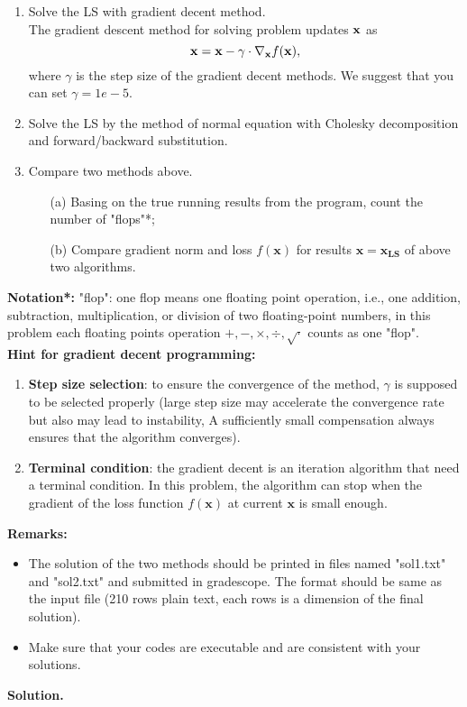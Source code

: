 \documentclass[english,onecolumn]{IEEEtran}
\begin{document}
\begin{enumerate}
    \item Solve the LS with gradient decent method.\\
    The gradient descent method for solving problem updates $ {\bf x}$ as
    $$
        {\bf x} = {\bf x} - \gamma \cdot \nabla_{{\bf x}} f(\mathbf{x}),
    $$
    where $\gamma$ is the step size of the gradient decent methods. We suggest that you can set $\gamma=1e-5$.
    \item Solve the LS by the method of normal equation with Cholesky decomposition and forward/backward substitution.
    \item Compare two methods above. 
    \begin{enumerate}
        \item[(a)] Basing on the true running results from the program, count the number of "flops"*;
        \item[(b)] Compare gradient norm and loss $f(\mathbf{x})$ for results $\mathbf{x}=\mathbf{x_{LS}}$ of above two algorithms.
    \end{enumerate}
\end{enumerate}
    \textbf{Notation*:} "flop": one flop means one floating point operation, i.e., one addition, subtraction, multiplication, or division of two floating-point numbers, in this problem each floating points operation $+,-,\times, \div, \sqrt{\cdot}$ counts as one "flop". \\
    \textbf{Hint for gradient decent programming:} 
    \begin{enumerate}
        \item \textbf{Step size selection}: to ensure the convergence of the method, $\gamma$ is supposed to be selected properly (large step size may accelerate the convergence rate but also may lead to instability, A sufficiently small compensation always ensures that the algorithm converges). 
        \item \textbf{Terminal condition}: the gradient decent is an iteration algorithm that need a terminal condition. In this problem, the algorithm can stop when the gradient of the loss function $f(\mathbf{x})$ at current $\mathbf{x}$ is small enough.
    \end{enumerate}
    \noindent\textbf{Remarks: }
   \begin{itemize}
    \item The solution of the two methods should be printed in files named "sol1.txt" and "sol2.txt" and submitted in gradescope.  The format should be same as the input file (210 rows plain text, each rows is a dimension of the final solution).
    \item Make sure that your codes are executable and are consistent with your solutions.
   \end{itemize}
\noindent
\textbf{Solution.}
\end{document}
